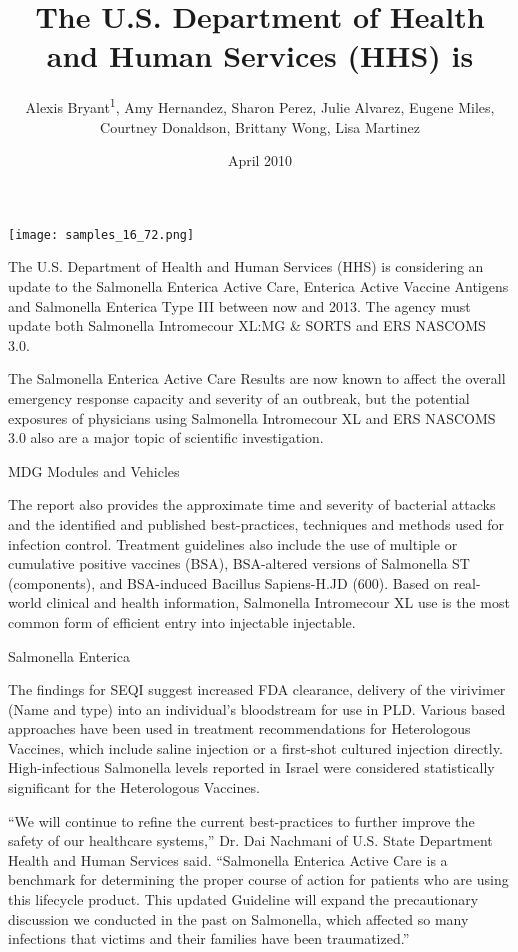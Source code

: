 \documentclass{article}
\title{The U.S. Department of Health and Human Services (HHS) is}
\author{Alexis Bryant\textsuperscript{1},  Amy Hernandez,  Sharon Perez,  Julie Alvarez,  Eugene Miles,  Courtney Donaldson,  Brittany Wong,  Lisa Martinez}
\affil{\textsuperscript{1}Virginia Polytechnic Institute and State University}
\date{April 2010}
\begin{document}
\maketitle

\begin{center}
\begin{minipage}{0.75\linewidth}
\texttt{[image: samples\_16\_72.png]}
\end{minipage}
\end{center}

The U.S. Department of Health and Human Services (HHS) is considering an update to the Salmonella Enterica Active Care, Enterica Active Vaccine Antigens and Salmonella Enterica Type III between now and 2013. The agency must update both Salmonella Intromecour XL:MG \& SORTS and ERS NASCOMS 3.0.

The Salmonella Enterica Active Care Results are now known to affect the overall emergency response capacity and severity of an outbreak, but the potential exposures of physicians using Salmonella Intromecour XL and ERS NASCOMS 3.0 also are a major topic of scientific investigation.

MDG Modules and Vehicles

The report also provides the approximate time and severity of bacterial attacks and the identified and published best-practices, techniques and methods used for infection control. Treatment guidelines also include the use of multiple or cumulative positive vaccines (BSA), BSA-altered versions of Salmonella ST (components), and BSA-induced Bacillus Sapiens-H.JD (600). Based on real-world clinical and health information, Salmonella Intromecour XL use is the most common form of efficient entry into injectable injectable.

Salmonella Enterica

The findings for SEQI suggest increased FDA clearance, delivery of the virivimer (Name and type) into an individual’s bloodstream for use in PLD. Various based approaches have been used in treatment recommendations for Heterologous Vaccines, which include saline injection or a first-shot cultured injection directly. High-infectious Salmonella levels reported in Israel were considered statistically significant for the Heterologous Vaccines.

“We will continue to refine the current best-practices to further improve the safety of our healthcare systems,” Dr. Dai Nachmani of U.S. State Department Health and Human Services said. “Salmonella Enterica Active Care is a benchmark for determining the proper course of action for patients who are using this lifecycle product. This updated Guideline will expand the precautionary discussion we conducted in the past on Salmonella, which affected so many infections that victims and their families have been traumatized.”
\end{document}
